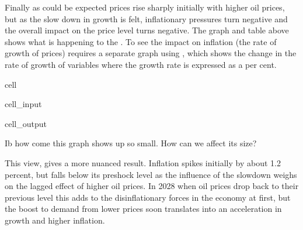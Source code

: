 \documentclass[letterpaper,10pt,english]{jupyterBook}
\begin{document}
\sphinxAtStartPar
Finally as could be expected prices rise sharply initially with higher oil prices, but as the slow down in growth is felt, inflationary pressures turn negative and the overall impact on the price level turns negative.  The graph and table above shows what is happening to the . To see the impact on inflation (the rate of growth of prices) requires a separate graph using , which shows the change in the rate of growth of variables where the growth rate is expressed as a per cent.

\begin{sphinxuseclass}{cell}\begin{sphinxVerbatimInput}

\begin{sphinxuseclass}{cell_input}
\begin{sphinxVerbatim}[commandchars=\\\{\}]
\PYG{p}{[}\PYG{p}{]}
\end{sphinxVerbatim}

\end{sphinxuseclass}\end{sphinxVerbatimInput}
\begin{sphinxVerbatimOutput}

\begin{sphinxuseclass}{cell_output}
\noindent{}

\end{sphinxuseclass}\end{sphinxVerbatimOutput}

\end{sphinxuseclass}
\sphinxAtStartPar
 Ib how come this graph shows up so small.  How can we affect its size?

\sphinxAtStartPar
This view, gives a more nuanced result.  Inflation spikes initially by about 1.2 percent, but falls below its pre\sphinxhyphen{}shock level as the influence of the slowdown weighs on the lagged effect of higher oil prices. In 2028 when oil prices drop back to their previous level this adds to the dis\sphinxhyphen{}inflationary forces in the economy at first, but the boost to demand from lower prices soon translates into an acceleration in growth and higher inflation.
\end{document}
